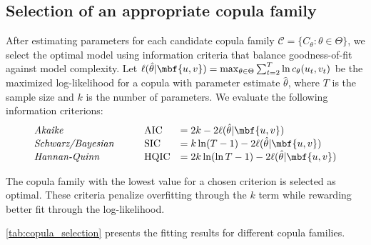 \subsection{Selection of an appropriate copula family}

After estimating parameters for each candidate copula family $\mathcal{C} = \{C_\theta : \theta \in \Theta\}$, we select the optimal model using information criteria that balance goodness-of-fit against model complexity. Let $\ell(\hat{\theta}|\mbf {u,v}) = \max_{\theta\in\Theta} \sum_{t=2}^T \ln c_{{\theta}}(u_t, v_t)$ be the maximized log-likelihood for a copula with parameter estimate $\hat{\theta}$, where $T$ is the sample size and $k$ is the number of parameters. We evaluate the following information criterions:
$$
\begin{array}{lllll}
\text{\textit{Akaike}} &&& \text{AIC} &= 2k - 2
\ell(\hat{\theta}|\mbf {u,v})
\\
\text{\textit{Schwarz/Bayesian}} &&& \text{SIC} &= k\ln(T-1) - 2
\ell(\hat{\theta}|\mbf {u,v})
\\
\text{\textit{Hannan-Quinn}} &&& \text{HQIC} &= 2k\ln(\ln T-1) - 2
\ell(\hat{\theta}|\mbf {u,v})
\end{array}
$$

The copula family with the lowest value for a chosen criterion is selected as optimal. These criteria penalize overfitting through the $k$ term while rewarding better fit through the log-likelihood.
 
 
 \cref{tab:copula_selection} presents the fitting results for different copula families. 

